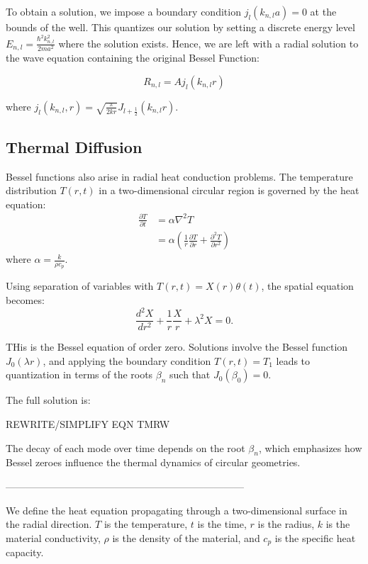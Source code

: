 \documentclass[linenumbers, twocolumn]{aastex631}
\begin{document}
\noindent To obtain a solution, we impose a boundary condition $j_l(k_{n,l}a)=0$ at the
bounds of the well. This quantizes our solution by setting a discrete energy
level $E_{n,l}=\frac{\hbar^2k_{n,l}^2}{2ma^2}$ where the solution exists. Hence,
we are left with a radial solution to the wave equation containing the original
Bessel Function:

\begin{equation}
    R_{n,l}=Aj_l(k_{n,l}r)
\end{equation}

\noindent where $j_l(k_{n,l},r)=\sqrt{\frac{\pi}{2kr}}J_{l+\frac{1}{2}}(k_{n,l}r)$.\\


\subsection{Thermal Diffusion}

Bessel functions also arise in radial heat conduction problems. The temperature
distribution $T(r,t)$ in a two-dimensional circular region is governed by the
heat equation:
\begin{align}
    \frac{\partial T}{\partial t}&=\alpha\nabla^2T\\
    &=\alpha\left(\frac{1}{r} \frac{\partial T}{\partial r} + \frac{\partial^2 T}{\partial r^2}\right)
\end{align}
\noindent where $\alpha=\frac{k}{\rho c_p}$.

\noindent Using separation of variables with $T(r,t)=X(r)\theta(t)$, the spatial equation becomes:
\begin{equation}
    \frac{d^2X}{dr^2}+\frac{1}{r}\frac{X}{r}+\lambda^2X=0.
\end{equation}

\noindent THis is the Bessel equation of order zero. Solutions involve the
Bessel function $J_0(\lambda r)$, and applying the boundary condition 
$T(r,t)=T_1$ leads to quantization in terms of the roots $\beta_n$ such
that $J_0(\beta_0)=0$.

\noindent The full solution is:

REWRITE/SIMPLIFY EQN TMRW

\noindent The decay of each mode over time depends on the root $\beta_n$,
which emphasizes how Bessel zeroes influence the thermal dynamics of
circular geometries.


------------------------------------------------------------------------

We define the heat equation propagating through a two-dimensional surface in
the radial direction. $T$ is the temperature, $t$ is the time, $r$ is the radius,
$k$ is the material conductivity, $\rho$ is the density of the material, and $c_p$
is the specific heat capacity.
\end{document}
